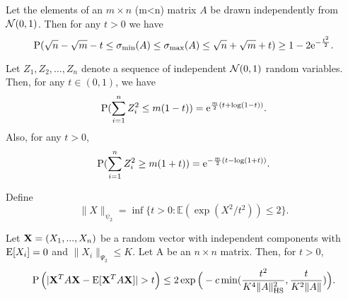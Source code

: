 \documentclass[onecolumn]{IEEEtran}
\begin{document}
\begin{lemma}\label{lem:singvalues}\cite{RudelsonVershinin2010}
Let the elements of an $m \times n$ (m<n) matrix $A$ be drawn independently from $\Nc(0,1)$. Then for any $t>0$ we have
\[
\P(\sqrt{n}-\sqrt{m}- t \leq \sigma_{\min} (A) \leq \sigma_{\max}(A) \leq \sqrt{n}+\sqrt{m}+ t) \geq 1-  2 {\rm e}^{-\frac{t^2}{2}}.
\] 
\end{lemma}


\begin{lemma}\label{lem:conc:chisq}
Let $Z_1, Z_2, \ldots, Z_n$ denote a sequence of independent $\Nc(0,1)$ random variables. Then, for any $t\in(0,1)$, we have
\[
\P (\sum_{i=1}^n Z_i^2 \leq m (1-t)) =  {\rm e}^{\frac{m}{2} (t + \log (1- t)) }. 
\]
Also, for any $t>0$,
\[
\P (\sum_{i=1}^n Z_i^2 \geq m (1+t)) =  {\rm e}^{-\frac{m}{2} (t -\log (1+ t)) }. 
\]
\end{lemma}

%

Define
\begin{equation}
\|X\|_{\psi_2} = \inf\{t>0 : \mathbb{E} (\exp (X^2/t^2)) \leq 2\}. 
\end{equation}


\begin{theorem} \label{thm:HW-ineq}
Let $\Xv= (X_1,...,X_n)$ be a random vector with independent components with $\E[X_i]=0$ and $\|X_i\|_{\Psi_2}\leq K$. Let A be an $n\times n$ matrix. Then, for $t>0$, 
\[
\P\Big(|\Xv^T A\Xv-\E[\Xv^T A\Xv]|>t \Big)\leq 2\exp\Big(-c\min({t^2\over K^4\|A\|_{\rm HS}^2 },{t \over K^2\|A\| })\Big).
\]
\end{theorem}
\end{document}
